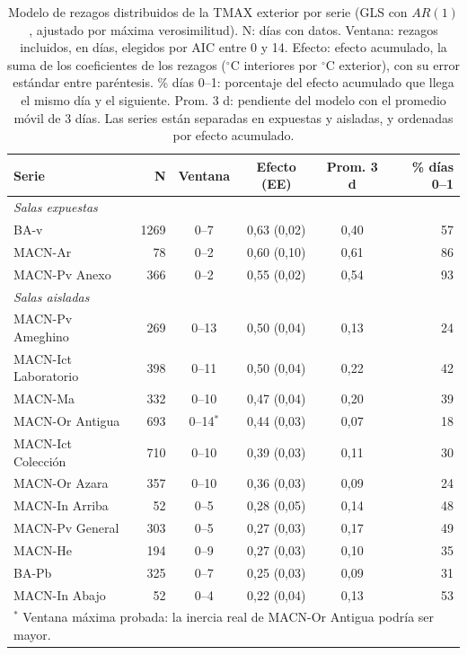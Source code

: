 \documentclass[11pt,a4paper]{article}
\begin{document}
\begin{table}[htbp]
\centering
\footnotesize
\setlength{\tabcolsep}{4pt}
\caption{Modelo de rezagos distribuidos de la TMAX exterior por serie (GLS con $AR(1)$, ajustado por máxima verosimilitud). N: días con datos. Ventana: rezagos incluidos, en días, elegidos por AIC entre 0 y 14. Efecto: efecto acumulado, la suma de los coeficientes de los rezagos ($^\circ$C interiores por $^\circ$C exterior), con su error estándar entre paréntesis. \% días 0--1: porcentaje del efecto acumulado que llega el mismo día y el siguiente. Prom. 3 d: pendiente del modelo con el promedio móvil de 3 días. Las series están separadas en expuestas y aisladas, y ordenadas por efecto acumulado.}
\label{tab:inercia}
\begin{tabular}{l r c c c r}
\toprule
\textbf{Serie} & \textbf{N} & \textbf{Ventana} & \textbf{Efecto (EE)} & \textbf{Prom. 3 d} & \textbf{\% días 0--1} \\
\midrule
\multicolumn{6}{l}{\textit{Salas expuestas}} \\
BA-v                 & 1269 & 0--7  & 0{,}63 (0{,}02) & 0{,}40 & 57 \\
MACN-Ar              &   78 & 0--2  & 0{,}60 (0{,}10) & 0{,}61 & 86 \\
MACN-Pv Anexo        &  366 & 0--2  & 0{,}55 (0{,}02) & 0{,}54 & 93 \\
\midrule
\multicolumn{6}{l}{\textit{Salas aisladas}} \\
MACN-Pv Ameghino     &  269 & 0--13 & 0{,}50 (0{,}04) & 0{,}13 & 24 \\
MACN-Ict Laboratorio &  398 & 0--11 & 0{,}50 (0{,}04) & 0{,}22 & 42 \\
MACN-Ma              &  332 & 0--10 & 0{,}47 (0{,}04) & 0{,}20 & 39 \\
MACN-Or Antigua      &  693 & 0--14$^{*}$ & 0{,}44 (0{,}03) & 0{,}07 & 18 \\
MACN-Ict Colección   &  710 & 0--10 & 0{,}39 (0{,}03) & 0{,}11 & 30 \\
MACN-Or Azara        &  357 & 0--10 & 0{,}36 (0{,}03) & 0{,}09 & 24 \\
MACN-In Arriba       &   52 & 0--5  & 0{,}28 (0{,}05) & 0{,}14 & 48 \\
MACN-Pv General      &  303 & 0--5  & 0{,}27 (0{,}03) & 0{,}17 & 49 \\
MACN-He              &  194 & 0--9  & 0{,}27 (0{,}03) & 0{,}10 & 35 \\
BA-Pb                &  325 & 0--7  & 0{,}25 (0{,}03) & 0{,}09 & 31 \\
MACN-In Abajo        &   52 & 0--4  & 0{,}22 (0{,}04) & 0{,}13 & 53 \\
\bottomrule
\multicolumn{6}{l}{\footnotesize $^{*}$ Ventana máxima probada: la inercia real de MACN-Or Antigua podría ser mayor.}
\end{tabular}
\end{table}
\end{document}
